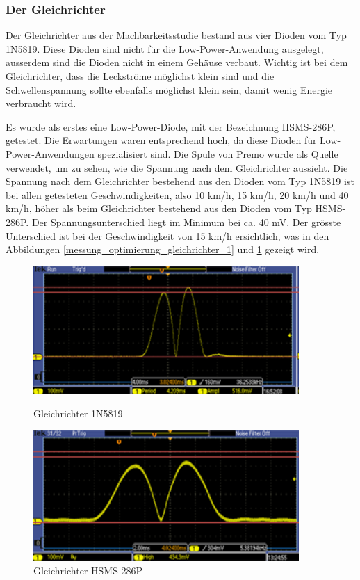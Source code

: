 \subsubsection{Der Gleichrichter}

Der Gleichrichter aus der Machbarkeitsstudie bestand aus vier Dioden vom Typ 1N5819. Diese Dioden sind nicht für die Low-Power-Anwendung ausgelegt, ausserdem sind die Dioden nicht in einem Gehäuse verbaut. Wichtig ist bei dem Gleichrichter, dass die Leckströme möglichst klein sind und die Schwellenspannung sollte ebenfalls möglichst klein sein, damit wenig Energie verbraucht wird.

Es wurde als erstes eine Low-Power-Diode, mit der Bezeichnung HSMS-286P, getestet. Die Erwartungen waren entsprechend hoch, da diese Dioden für Low-Power-Anwendungen spezialisiert sind. Die Spule von Premo wurde als Quelle verwendet, um zu sehen, wie die Spannung nach dem Gleichrichter aussieht. Die Spannung nach dem Gleichrichter bestehend aus den Dioden vom Typ 1N5819 ist bei allen getesteten Geschwindigkeiten, also 10 km/h, 15 km/h, 20 km/h und 40 km/h, höher als beim Gleichrichter bestehend aus den Dioden vom Typ HSMS-286P. Der Spannungsunterschied liegt im Minimum bei ca. 40 mV. Der grösste Unterschied ist bei der Geschwindigkeit von 15 km/h ersichtlich, was in den Abbildungen \ref{messung_optimierung_gleichrichter_1} und \ref{pling} gezeigt wird.

\begin{figure}[ht]
 \begin{minipage}[t]{0.5\textwidth}
    \includegraphics[width=0.9\textwidth]{3Vorgehen/imag/Messung_Optimierung_Gleichrichter_1_links.png}
    \caption{Gleichrichter 1N5819}
    \label{messung_optimierung_gleichrichter_1} 
 \end{minipage}
 \begin{minipage}[t]{0.5\textwidth}
    \includegraphics[width=0.9\textwidth]{3Vorgehen/imag/Messung_Optimierung_Gleichrichter_1_rechts.png}
    \caption{Gleichrichter HSMS-286P}
    \label{pling}
 \end{minipage}
\end{figure}

